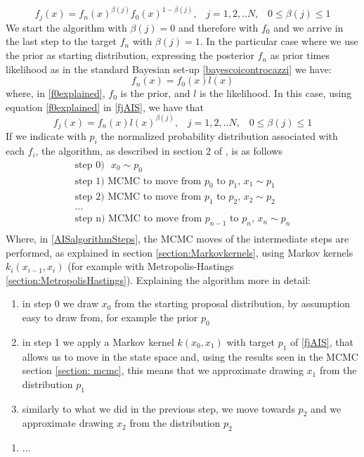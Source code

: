 \documentclass[12pt,mythesisstyle]{report}
\begin{document}
\begin{equation}\label{fjAIS}
f_j(x)=f_n(x)^{\beta(j)} f_0(x)^{1-{\beta(j)}}, \;\;\; j=1,2,..N, \;\;\; 0\leq\beta(j)\leq1
\end{equation}
We start the algorithm with $\beta(j)=0$ and therefore with $f_0$ and we arrive in the last step to the target $f_n$ with $\beta(j)=1$. In the particular case where we use the prior as starting distribution, expressing the posterior $f_n$ as prior times likelihood as in the standard Bayesian set-up \eqref{bayescoicontrocazzi} we have:
\begin{equation}\label{f0explained}
f_n(x)=f_0(x)l(x)
\end{equation}
where, in \eqref{f0explained}, $f_0$ is the prior, and $l$ is the likelihood. In this case, using equation \eqref{f0explained} in \eqref{fjAIS}, we have that
\begin{equation}\label{fjsimplified}
f_j(x)=f_n(x)l(x)^{\beta(j)}, \;\;\; j=1,2,..N, \;\;\; 0\leq\beta(j)\leq1
\end{equation}
If we indicate with $p_i$ the normalized probability distribution associated with each $f_i$, the algorithm, as described in section 2 of \cite{annealedis}, is as follows
\begin{equation}\label{AISalgorithmSteps}
\begin{aligned}
\text{step 0)}  \text{ }x_{0}\sim p_{0} \\
\text{step 1)} \text{ MCMC to move from } p_0 \text{ to } p_1\text{, }x_{1}\sim p_{1}\\
\text{step 2)}  \text{ MCMC to move from } p_1 \text{ to } p_2\text{, }x_{2}\sim p_{2}\\
... \\
\text{step n)} \text{ MCMC to move from } p_{n-1} \text{ to } p_n\text{, }x_{n}\sim p_{n} \\
\end{aligned}
\end{equation}
Where, in \eqref{AISalgorithmSteps}, the MCMC moves of the intermediate steps are performed, as explained in section \ref{section:Markovkernels}, using Markov kernels $k_i(x_{i-1},x_i)$ (for example with Metropolis-Hastings \ref{section:MetropolisHastings}). Explaining the algorithm more in detail: 
\begin{enumerate}\addtocounter{enumi}{-1}
	\item in step 0 we draw $x_{0}$ from the starting proposal distribution, by assumption easy to draw from, for example the prior $p_{0}$
	\item in step 1 we apply a Markov kernel $k(x_0,x_1)$ with target $p_1$ of \eqref{fjAIS}, that allows us to move in the state space and, using the results seen in the MCMC section \ref{section: mcmc}, this means that we approximate drawing $x_1$ from the distribution $p_1$
	\item similarly to what we did in the previous step, we move towards $p_2$ and we approximate drawing $x_2$ from the distribution $p_2$
\end{enumerate}
\begin{enumerate}[label=...]
	\item ...
\end{enumerate}
\end{document}
